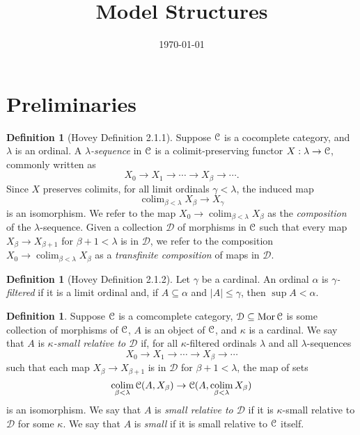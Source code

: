 \documentclass{amsart}
\title{Model Structures}
\author{}
\date{\today}
\theoremstyle{plain}
\theoremstyle{definition}
\newtheorem{definition}[theorem]{Definition}
\newcommand{\sseq}{\subseteq}
\newcommand{\0}{\mathbf{0}}
\newcommand{\cC}{\mathcal C}
\newcommand{\cD}{\mathcal D}
\renewcommand{\(}{\left(}
\renewcommand{\)}{\right)}
\def\scr{\EuScript}
\def\cC{\scr{C}}
\DeclareMathOperator*{\colim}{colim}
\DeclareMathOperator{\Mor}{Mor}
\begin{document}
\maketitle


\tableofcontents

\section{Preliminaries}

\begin{definition}[Hovey Definition 2.1.1]
  Suppose $\cC$ is a cocomplete category, and $\lambda$ is an ordinal. A \textit{$\lambda$-sequence} in $\cC$ is a colimit-preserving functor $X:\lambda\to\cC$, commonly written as
  \[X_0\to X_1\to\cdots\to X_\beta\to\cdots.\]
  Since $X$ preserves colimits, for all limit ordinals $\gamma<\lambda$, the induced map
  \[\colim_{\beta<\lambda}X_\beta\to X_\gamma\]
  is an isomorphism. We refer to the map $X_0\to \colim_{\beta<\lambda}X_\beta$ as the \textit{composition} of the $\lambda$-sequence. Given a collection $\cD$ of morphisms in $\cC$ such that every map $X_\beta\to X_{\beta+1}$ for $\beta+1<\lambda$ is in $\cD$, we refer to the composition $X_0\to\colim_{\beta<\lambda}X_\beta$ as a \textit{transfinite composition} of maps in $\cD$.
\end{definition}

\begin{definition}[Hovey Definition 2.1.2]
  Let $\gamma$ be a cardinal. An ordinal $\alpha$ is \textit{$\gamma$-filtered} if it is a limit ordinal and, if $A\sseq\alpha$ and $|A|\leq\gamma$, then $\sup A<\alpha$.
\end{definition}

\begin{definition}
  Suppose $\cC$ is a comcomplete category, $\cD\sseq\Mor\cC$ is some collection of morphisms of $\cC$, $A$ is an object of $\cC$, and $\kappa$ is a cardinal. We say that $A$ is \textit{$\kappa$-small relative to $\cD$} if, for all $\kappa$-filtered ordinals $\lambda$ and all $\lambda$-sequences
  \[X_0\to X_1\to\cdots\to X_\beta\to\cdots\]
  such that each map $X_\beta\to X_{\beta+1}$ is in $\cD$ for $\beta+1<\lambda$, the map of sets
  \[\colim_{\beta<\lambda}\cC(A,X_\beta)\to\cC(A,\colim_{\beta<\lambda}X_\beta)\]
  is an isomorphism. We say that $A$ is \textit{small relative to $\cD$} if it is $\kappa$-small relative to $\cD$ for some $\kappa$. We say that $A$ is \textit{small} if it is small relative to $\cC$ itself.
\end{definition}
\end{document}
